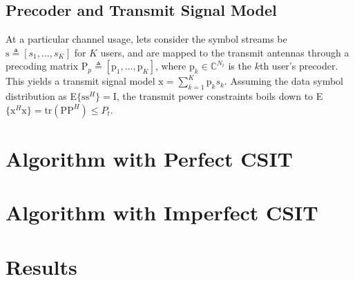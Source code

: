 \documentclass[journal]{IEEEtran}
\begin{document}
\subsection{Precoder and Transmit Signal Model}
At a particular channel usage, lets consider the symbol streams be $\bm{\mathrm{s}} \triangleq [s_1,...,s_K]$ for $K$ users, and are mapped to the transmit antennas through a precoding matrix $\bm{\mathrm{P}}_p \triangleq [\bm{\mathrm{p}}_1,...,\bm{\mathrm{p}}_K]$, where $\bm{\mathrm{p}}_k \in \mathbb{C}^{N_t}$ is the $k$th user's precoder. This yields a transmit signal model $\bm{\mathrm{x}} = \sum_{k=1}^K \bm{\mathrm{p}}_k s_k$. Assuming the data symbol distribution as E$\{\bm{\mathrm{ss}}^H\} = \bm{\mathrm{I}}$, the transmit power constraints boils down to E$\{\bm{\mathrm{x}}^H\bm{\mathrm{x}}\} = \text{tr}(\bm{\mathrm{PP}}^H) \leq P_t$.

\section{Algorithm with Perfect CSIT} \label{per_alg}

\section{Algorithm with Imperfect CSIT} \label{imper_alg}

\section{Results} \label{res}
%
%
\end{document}
